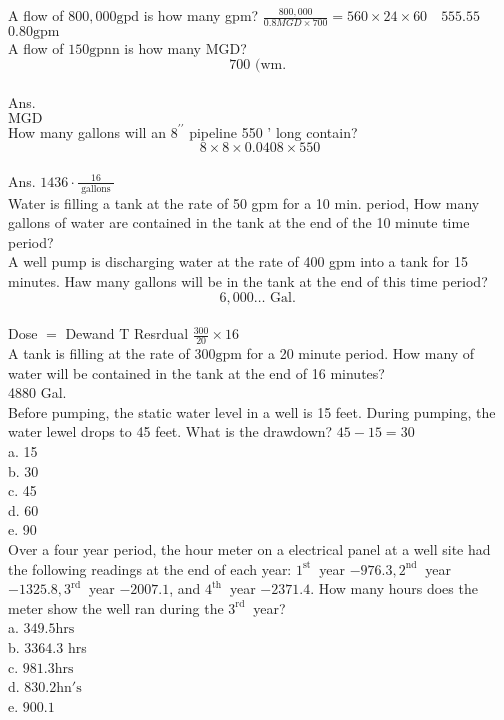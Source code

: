 A flow of $800,000 \mathrm{gpd}$ is how many gpm? $\frac{800,000}{0.8 M G D \times 700}=560 \times 24 \times 60 \quad 555.55$\\
$0.80 \mathrm{gpm}$\\

A flow of $150 \mathrm{gpnn}$ is how many MGD?\\
$$700 \text { (wm. }$$\\
Ans.\\
$\mathrm{MGD}$\\

How many gallons will an $8^{\prime \prime}$ pipeline 550 ' long contain?\\
$$8 \times 8 \times 0.0408 \times 550$$\\
Ans. $1436 \cdot \frac{16}{\text { gallons }}$\\

Water is filling a tank at the rate of 50 gpm for a 10 min. period, How many gallons of water are contained in the tank at the end of the 10 minute time period?\\

A well pump is discharging water at the rate of 400 gpm into a tank for 15 minutes. Haw many gallons will be in the tank at the end of this time period?\\
$$6,000 \ldots \text { Gal. }$$\\
Dose $=$ Dewand T Resrdual $\frac{300}{20} \times 16$\\

A tank is filling at the rate of $300 \mathrm{gpm}$ for a 20 minute period. How many of water will be contained in the tank at the end of 16 minutes?\\
4880 Gal.\\

Before pumping, the static water level in a well is 15 feet. During pumping, the water lewel drops to 45 feet. What is the drawdown? $45-15=30$\\
a. 15\\
b. 30\\
c. 45\\
d. 60\\
e. 90\\

Over a four year period, the hour meter on a electrical panel at a well site had the following readings at the end of each year: $1^{\text {st }}$ year $-976.3,2^{\text {nd }}$ year $-1325.8,3^{\text {rd }}$ year $-2007.1$, and $4^{\text {th }}$ year $-2371.4$. How many hours does the meter show the well ran during the $3^{\text {rd }}$ year?\\
a. $349.5 \mathrm{hrs}$\\
b. $3364.3$ hrs\\
c. $981.3 \mathrm{hrs}$\\
d.  $830.2 \mathrm{hn \prime s}$\\
e. $900.1$\\


